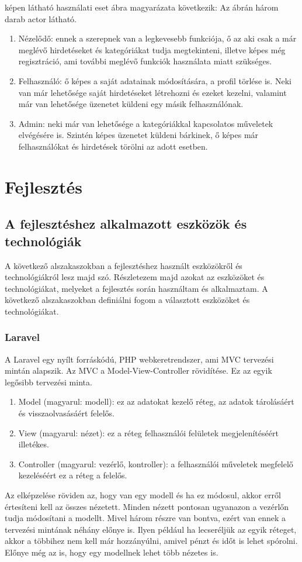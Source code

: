 \documentclass[]{thesis-ekf}
\theoremstyle{definition}
\theoremstyle{remark}
\begin{document}
	 képen látható használati eset ábra magyarázata következik:
	Az ábrán három darab actor látható.
	\begin{enumerate}
		\item Nézelődő: ennek a szerepnek van a legkevesebb funkciója, ő az aki csak a már meglévő hirdetéseket és kategóriákat tudja megtekinteni, illetve képes még regisztráció, ami további meglévő funkciók használata miatt szükséges.
		\item Felhasználó: ő képes a saját adatainak módosítására, a profil törlése is. Neki van már lehetősége saját hirdetéseket létrehozni és ezeket kezelni, valamint már van lehetősége üzenetet küldeni egy másik felhasználónak.
		\item Admin: neki már van lehetősége a kategóriákkal kapcsolatos műveletek elvégésére is. Szintén képes üzenetet küldeni bárkinek, ő képes már felhasználókat és hirdetések törölni az adott esetben.
	\end{enumerate}	

	\chapter{Fejlesztés}		
	\section{A fejlesztéshez alkalmazott eszközök és technológiák}
		A következő alszakaszokban a fejlesztéshez használt eszközökről és technológiákról lesz majd szó. Részletezem majd azokat az eszközöket és technológiákat, melyeket a fejlesztés során használtam és alkalmaztam. A következő alszakaszokban definiálni fogom a választott eszközöket és technológiákat. 
	\subsection{Laravel}\label{sc-laravel}
		A Laravel egy nyílt forráskódú, PHP webkeretrendszer, ami MVC tervezési mintán alapszik. Az MVC a Model-View-Controller rövidítése. Ez az egyik legősibb tervezési minta.
		\begin{enumerate}
			\item Model (magyarul: modell): ez az adatokat kezelő réteg, az adatok tárolásáért és visszaolvasásáért felelős.
			\item View (magyarul: nézet): ez a réteg felhasználói felületek megjelenítéséért illetékes. 
			\item Controller (magyarul: vezérlő, kontroller): a felhasználói műveletek megfelelő kezeléséért ez a réteg a felelős.
		\end{enumerate}
		Az elképzelése röviden az, hogy van egy modell és ha ez módosul, akkor erről értesíteni kell az összes nézetett. Minden nézett pontosan ugyanazon a vezérlőn tudja módosítani a modellt. Mivel három részre van bontva, ezért van ennek a tervezési mintának néhány előnye is. Ilyen például ha lecseréljük az egyik réteget, akkor a többihez nem kell már hozzányúlni, amivel pénzt és időt is lehet spórolni. Előnye még az is, hogy egy modellnek lehet több nézetes is.
		\cite[102-103.~oldal]{Kusper}
\end{document}
